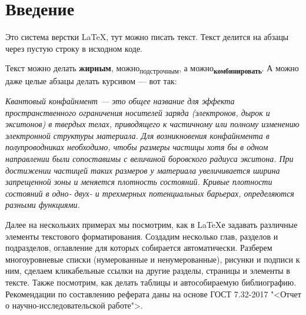 \chapter*{Введение}
\label{ch:intro}

    Это система верстки \LaTeX, тут можно писать текст. Текст делится на абзацы через пустую строку в исходном коде.

    Текст можно делать \textbf{жирным}, можно\textsubscript{подстрочным}, а можно\textbf{\textsubscript{комбинировать}}. А можно даже целые абзацы делать курсивом --- вот так:

{ \itshape
    Квантовый конфайнмент --- это общее название для эффекта пространственного ограничения носителей заряда (электронов, дырок и экситонов) в твердых телах, приводящего к частичному или полному изменению электронной структуры материала. Для возникновения конфайнмента в полупроводниках необходимо, чтобы размеры частицы хотя бы в одном направлении были сопоставимы с величиной боровского радиуса экситона. При достижении частицей таких размеров у материала увеличивается ширина запрещенной зоны и меняется плотность состояний. Кривые плотности состояний в одно- двух- и трехмерных потенциальных барьерах, определяются разными функциями.
}    

    Далее на нескольких примерах мы посмотрим, как в \LaTeX{}е задавать различные элементы текстового форматирования. Создадим несколько глав, разделов и подразделов, оглавление для которых собирается автоматически. Разберем многоуровневые списки (нумерованные и ненумерованные), рисунки и подписи к ним, сделаем кликабельные ссылки на другие разделы, страницы и элементы в тексте. Также посмотрим, как делать таблицы и автособираемую библиографию. Рекомендации по составлению реферата даны на основе ГОСТ 7.32-2017 "<Отчет о научно-исследовательской работе">.

\endinput